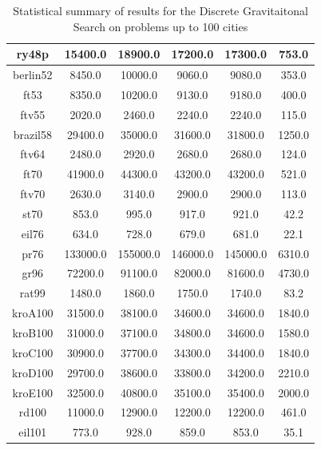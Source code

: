\documentclass{article}
\begin{document}
\begin{table}[h!]
{\begin{tabular}{|c||c|c|c|c|c|}
            \hline
            ry48p & 15400.0 & 18900.0 & 17200.0 & 17300.0 & 753.0 \\
            \hline
            berlin52 & 8450.0 & 10000.0 & 9060.0 & 9080.0 & 353.0 \\
            \hline
            ft53 & 8350.0 & 10200.0 & 9130.0 & 9180.0 & 400.0 \\
            \hline
            ftv55 & 2020.0 & 2460.0 & 2240.0 & 2240.0 & 115.0 \\
            \hline
            brazil58 & 29400.0 & 35000.0 & 31600.0 & 31800.0 & 1250.0 \\
            \hline
            ftv64 & 2480.0 & 2920.0 & 2680.0 & 2680.0 & 124.0 \\
            \hline
            ft70 & 41900.0 & 44300.0 & 43200.0 & 43200.0 & 521.0 \\
            \hline
            ftv70 & 2630.0 & 3140.0 & 2900.0 & 2900.0 & 113.0 \\
            \hline
            st70 & 853.0 & 995.0 & 917.0 & 921.0 & 42.2 \\
            \hline
            eil76 & 634.0 & 728.0 & 679.0 & 681.0 & 22.1 \\
            \hline
            pr76 & 133000.0 & 155000.0 & 146000.0 & 145000.0 & 6310.0 \\
            \hline
            gr96 & 72200.0 & 91100.0 & 82000.0 & 81600.0 & 4730.0 \\
            \hline
            rat99 & 1480.0 & 1860.0 & 1750.0 & 1740.0 & 83.2 \\
            \hline
            kroA100 & 31500.0 & 38100.0 & 34600.0 & 34600.0 & 1840.0 \\
            \hline
            kroB100 & 31000.0 & 37100.0 & 34800.0 & 34600.0 & 1580.0 \\
            \hline
            kroC100 & 30900.0 & 37700.0 & 34300.0 & 34400.0 & 1840.0 \\
            \hline
            kroD100 & 29700.0 & 38600.0 & 33800.0 & 34200.0 & 2210.0 \\
            \hline
            kroE100 & 32500.0 & 40800.0 & 35100.0 & 35400.0 & 2000.0 \\
            \hline
            rd100 & 11000.0 & 12900.0 & 12200.0 & 12200.0 & 461.0 \\
            \hline
            eil101 & 773.0 & 928.0 & 859.0 & 853.0 & 35.1 \\
            \hline
        \end{tabular}
        }
        \caption{Statistical summary of results for the Discrete Gravitaitonal Search on problems up to 100 cities}
    \end{table}
\end{document}
